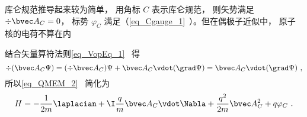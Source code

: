 
\begin{issues}
\issueDraft
\end{issues}


库仑规范推导起来较为简单， 用角标 $C$ 表示库仑规范， 则矢势满足 $\div \bvec A_C = 0$， 标势 $\varphi_C$ 满足（\autoref{eq_Cgauge_1}~）。但在偶极子近似中， 原子核的电荷不算在内

结合矢量算符法则\autoref{eq_VopEq_1}~ 得
\begin{equation}
\div (\bvec A_C \Psi) = (\div \bvec A_C) \Psi + \bvec A_C \vdot (\grad \Psi) = \bvec A_C \vdot (\grad \Psi)~,
\end{equation}
所以\autoref{eq_QMEM_2}~ 简化为
\begin{equation}\label{eq_CouGau_4}
H = -\frac{1}{2m} \laplacian + \I \frac{q}{m} \bvec A_C \vdot \Nabla + \frac{q^2}{2m} \bvec A_C^2 + q\varphi_C~.
\end{equation}
